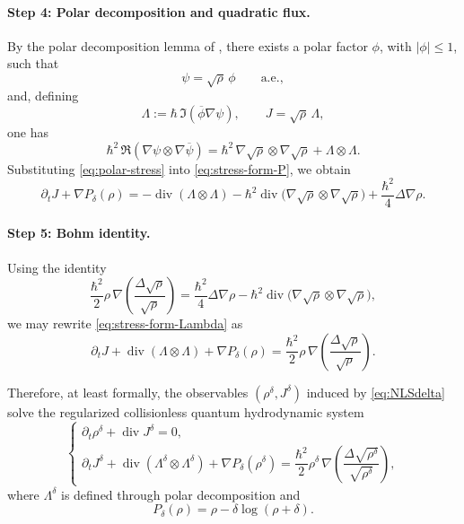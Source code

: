 \documentclass[11pt]{article}
\begin{document}
\paragraph{Step 4: Polar decomposition and quadratic flux.}
By the polar decomposition lemma of \cite{AntonelliMarcati2009}, there exists a polar factor \(\phi\), with \(|\phi|\le1\), such that
\[
\psi=\sqrt{\rho}\,\phi
\qquad\text{a.e.},
\]
and, defining
\[
\Lambda:=\hbar\,\Im(\overline{\phi}\nabla\psi),
\qquad
J=\sqrt{\rho}\,\Lambda,
\]
one has
\begin{equation}\label{eq:polar-stress}
\hbar^2\,\Re(\nabla\psi\otimes\nabla\overline{\psi})
=
\hbar^2\,\nabla\sqrt{\rho}\otimes\nabla\sqrt{\rho}
+\Lambda\otimes\Lambda.
\end{equation}
Substituting \eqref{eq:polar-stress} into \eqref{eq:stress-form-P}, we obtain
\begin{equation}\label{eq:stress-form-Lambda}
\partial_t J+\nabla P_\delta(\rho)
=
-\operatorname{div}(\Lambda\otimes\Lambda)
-\hbar^2\operatorname{div}\bigl(\nabla\sqrt{\rho}\otimes\nabla\sqrt{\rho}\bigr)
+\frac{\hbar^2}{4}\Delta\nabla\rho.
\end{equation}

\paragraph{Step 5: Bohm identity.}
Using the identity
\[
\frac{\hbar^2}{2}\rho\,\nabla\!\left(\frac{\Delta\sqrt{\rho}}{\sqrt{\rho}}\right)
=
\frac{\hbar^2}{4}\Delta\nabla\rho
-\hbar^2\operatorname{div}\bigl(\nabla\sqrt{\rho}\otimes\nabla\sqrt{\rho}\bigr),
\]
we may rewrite \eqref{eq:stress-form-Lambda} as
\begin{equation}\label{eq:qhd-momentum-final}
\partial_t J+\operatorname{div}(\Lambda\otimes\Lambda)+\nabla P_\delta(\rho)
=
\frac{\hbar^2}{2}\rho\,\nabla\!\left(\frac{\Delta\sqrt{\rho}}{\sqrt{\rho}}\right).
\end{equation}

Therefore, at least formally, the observables \((\rho^\delta,J^\delta)\) induced by \eqref{eq:NLSdelta} solve the regularized collisionless quantum hydrodynamic system
\begin{equation}\label{eq:QHD-final}
\begin{cases}
\partial_t\rho^\delta+\operatorname{div}J^\delta=0,\\[1mm]
\partial_t J^\delta+\operatorname{div}(\Lambda^\delta\otimes\Lambda^\delta)+\nabla P_\delta(\rho^\delta)
=
\dfrac{\hbar^2}{2}\rho^\delta\,\nabla\!\left(\dfrac{\Delta\sqrt{\rho^\delta}}{\sqrt{\rho^\delta}}\right),
\end{cases}
\end{equation}
where \(\Lambda^\delta\) is defined through polar decomposition and
\[
P_\delta(\rho)=\rho-\delta\log(\rho+\delta).
\]
\end{document}
